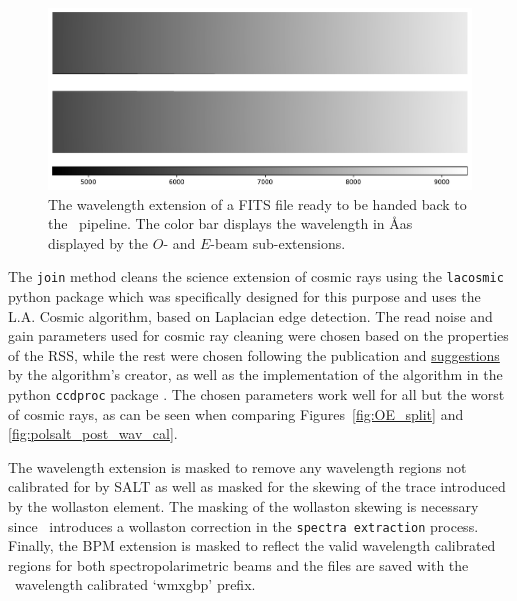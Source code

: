 \begin{figure}[t]
    \centering
    \includegraphics[width = 1.0\textwidth]{figures/3_pol_wav_ext.pdf}
    \caption{The wavelength extension of a \gls{FITS} file ready to be handed back to the \polsalt\ pipeline. The color bar displays the wavelength in \AA as displayed by the $O$- and $E$-beam sub-extensions.}
    \label{fig:pol_wav_ext}
\end{figure}

The \texttt{join} method cleans the science extension of cosmic rays using the \texttt{lacosmic} python package which was specifically designed for this purpose and uses the L.A. Cosmic algorithm, based on Laplacian edge detection. The read noise and gain parameters used for cosmic ray cleaning were chosen based on the properties of the \gls{RSS}, while the rest were chosen following the publication and \hyperlink{http://www.astro.yale.edu/dokkum/lacosmic/pars.html}{suggestions} by the algorithm's creator, as well as the implementation of the algorithm in the python \texttt{ccdproc} package \citep{lacosmic,astroscrappy}. The chosen parameters work well for all but the worst of cosmic rays, as can be seen when comparing Figures~\ref{fig:OE_split} and \ref{fig:polsalt_post_wav_cal}.

The wavelength extension is masked to remove any wavelength regions not calibrated for by \gls{SALT} as well as masked for the skewing of the trace introduced by the wollaston element. The masking of the wollaston skewing is necessary since \polsalt\ introduces a wollaston correction in the \texttt{spectra extraction} process. Finally, the \gls{BPM} extension is masked to reflect the valid wavelength calibrated regions for both spectropolarimetric beams and the files are saved with the \polsalt\ wavelength calibrated `wmxgbp' prefix.

